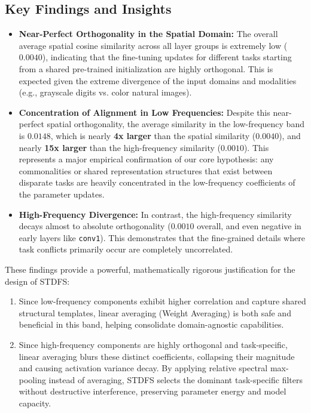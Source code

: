 \documentclass{article}
\theoremstyle{plain}
\theoremstyle{definition}
\theoremstyle{remark}
\begin{document}
\subsection{Key Findings and Insights}
\begin{itemize}
    \item \textbf{Near-Perfect Orthogonality in the Spatial Domain:} The overall average spatial cosine similarity across all layer groups is extremely low ($0.0040$), indicating that the fine-tuning updates for different tasks starting from a shared pre-trained initialization are highly orthogonal. This is expected given the extreme divergence of the input domains and modalities (e.g., grayscale digits vs. color natural images).
    \item \textbf{Concentration of Alignment in Low Frequencies:} Despite this near-perfect spatial orthogonality, the average similarity in the low-frequency band is $0.0148$, which is nearly \textbf{4x larger} than the spatial similarity ($0.0040$), and nearly \textbf{15x larger} than the high-frequency similarity ($0.0010$). This represents a major empirical confirmation of our core hypothesis: any commonalities or shared representation structures that exist between disparate tasks are heavily concentrated in the low-frequency coefficients of the parameter updates.
    \item \textbf{High-Frequency Divergence:} In contrast, the high-frequency similarity decays almost to absolute orthogonality ($0.0010$ overall, and even negative in early layers like \texttt{conv1}). This demonstrates that the fine-grained details where task conflicts primarily occur are completely uncorrelated.
\end{itemize}

These findings provide a powerful, mathematically rigorous justification for the design of STDFS:
\begin{enumerate}
    \item Since low-frequency components exhibit higher correlation and capture shared structural templates, linear averaging (Weight Averaging) is both safe and beneficial in this band, helping consolidate domain-agnostic capabilities.
    \item Since high-frequency components are highly orthogonal and task-specific, linear averaging blurs these distinct coefficients, collapsing their magnitude and causing activation variance decay. By applying relative spectral max-pooling instead of averaging, STDFS selects the dominant task-specific filters without destructive interference, preserving parameter energy and model capacity.
\end{enumerate}
\end{document}
